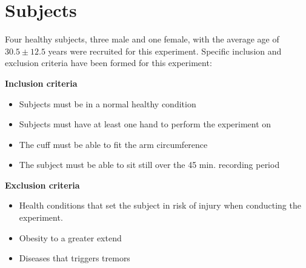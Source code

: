 \section{Subjects}

Four healthy subjects, three male and one female, with the average age of $30.5 \pm 12.5$ years were recruited for this experiment. Specific inclusion and exclusion criteria have been formed for this experiment:

\textbf{Inclusion criteria}
\begin{itemize}[noitemsep]
	\item Subjects must be in a normal healthy condition 
	\item Subjects must have at least one hand to perform the experiment on
	\item The cuff must be able to fit the arm circumference 
	\item The subject must be able to sit still over the 45 min. recording period 
\end{itemize}

\textbf{Exclusion criteria}
\begin{itemize}[noitemsep]
	\item Health conditions that set the subject in risk of injury when conducting the experiment.
	
	\item Obesity to a greater extend
	\item Diseases that triggers tremors   
\end{itemize} 

